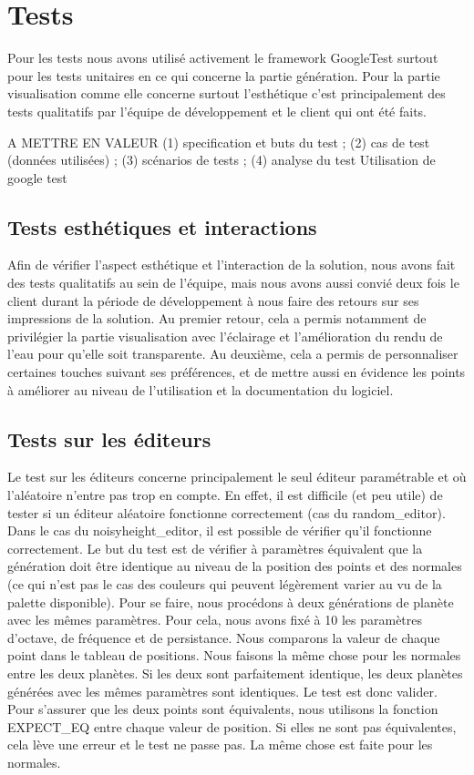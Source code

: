 \documentclass[a4paper]{article}
\begin{document}
\newpage 
\section{Tests}

Pour les tests nous avons utilisé activement le framework GoogleTest surtout pour les tests unitaires en ce qui concerne la partie génération. 
Pour la partie visualisation comme elle concerne surtout l'esthétique c'est principalement des tests qualitatifs par l'équipe de développement et le client qui ont été faits.

 A METTRE EN VALEUR
 (1) specification et buts du test ; (2) cas de test (données utilisées) ; (3) scénarios de tests ; (4) analyse du test
Utilisation de google test

\subsection{Tests esthétiques et interactions}

Afin de vérifier l'aspect esthétique et l'interaction de la solution, nous avons fait des tests qualitatifs au sein de l'équipe, mais nous avons aussi convié deux fois le client durant la période de développement à nous faire des retours sur ses impressions de la solution.
Au premier retour, cela a permis notamment de privilégier la partie visualisation avec l'éclairage et l'amélioration du rendu de l'eau pour qu'elle soit transparente. 
Au deuxième, cela a permis de personnaliser certaines touches suivant ses préférences, et de mettre aussi en évidence les points à améliorer au niveau de l'utilisation et la documentation du logiciel.

\subsection{Tests sur les éditeurs}

Le test sur les éditeurs concerne principalement le seul éditeur paramétrable et où l'aléatoire n'entre pas trop en compte. En effet, il est difficile (et peu utile) de tester si un éditeur aléatoire fonctionne correctement (cas du random\_editor). Dans le cas du noisyheight\_editor, il est possible de vérifier qu'il fonctionne correctement. Le but du test est de vérifier à paramètres équivalent que la génération doit être identique au niveau de la position des points et des normales (ce qui n'est pas le cas des couleurs qui peuvent légèrement varier au vu de la palette disponible). Pour se faire, nous procédons à deux générations de planète avec les mêmes paramètres. Pour cela, nous avons fixé à 10 les paramètres d'octave, de fréquence et de persistance. Nous comparons la valeur de chaque point dans le tableau de positions. Nous faisons la même chose pour les normales entre les deux planètes. Si les deux sont parfaitement identique, les deux planètes générées avec les mêmes paramètres sont identiques. Le test est donc valider. Pour s'assurer que les deux points sont équivalents, nous utilisons la fonction EXPECT\_EQ entre chaque valeur de position. Si elles ne sont pas équivalentes, cela lève une erreur et le test ne passe pas. La même chose est faite pour les normales.
\end{document}
